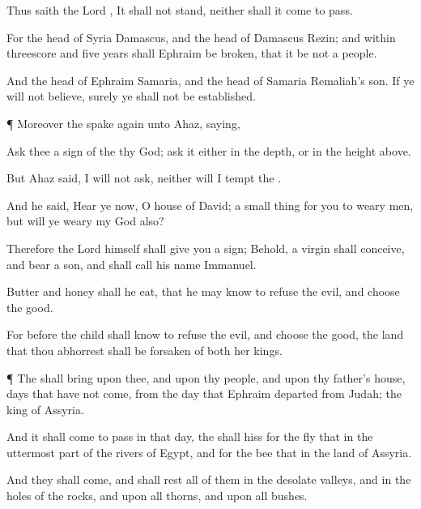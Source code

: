 {Thus
saith the
Lord
{}, It shall not
stand, neither shall it come to pass.

For the
head of
Syria
{}
Damascus, and the
head of
Damascus
{}
Rezin; and within
threescore and
five
years shall
Ephraim be
broken, that it be not a
people.

And the
head of
Ephraim
{}
Samaria, and the
head of
Samaria
{}
Remaliah’s
son. If ye will not
believe, surely ye shall not be
established.


\par }{\PP {}¶ Moreover the
{}
spake
again unto
Ahaz,
saying,

Ask thee a
sign of the
{} thy
God;
ask it either in the
depth, or in the
height
above.

But
Ahaz
said, I will not
ask, neither will I
tempt the
{}.

And he
said,
Hear ye now, O
house of
David;
{} a small
thing for you to
weary
men, but will ye
weary my
God also?

Therefore the
Lord himself shall
give you a
sign; Behold, a
virgin shall
conceive, and
bear a
son, and shall
call his
name
Immanuel.

Butter and
honey shall he
eat, that he may
know to
refuse the
evil, and
choose the
good.

For before the
child shall
know to
refuse the
evil, and
choose the
good, the
land that thou
abhorrest shall
be
forsaken of
both her
kings.


\par }{\PP {}¶ The
{} shall
bring upon thee, and upon thy
people, and upon thy
father’s
house,
days that have not
come, from the
day that
Ephraim
departed from
Judah;
{} the
king of
Assyria.

And it shall come to pass in that
day,
{} the
{} shall
hiss for the
fly that
{} in the uttermost
part of the
rivers of
Egypt, and for the
bee that
{} in the
land of
Assyria.

And they shall
come, and shall
rest all of them in the
desolate
valleys, and in the
holes of the
rocks, and upon all
thorns, and upon all
bushes.

}
